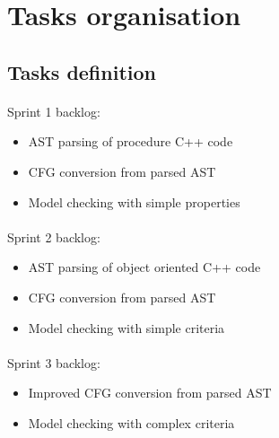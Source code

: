 \documentclass{report}
\begin{document}
\section{Tasks organisation}

\subsection{Tasks definition}

\paragraph{}
\hspace{4mm}\textnormal{Sprint 1 backlog:}

\vspace{3mm}
\begin{itemize}
\item AST parsing of procedure C++ code\vspace{1mm}
\item CFG conversion from parsed AST\vspace{1mm}
\item Model checking with simple properties\vspace{1mm}
\end{itemize}

\paragraph{}
\hspace{4mm}\textnormal{Sprint 2 backlog:}

\vspace{3mm}
\begin{itemize}
\item AST parsing of object oriented C++ code\vspace{1mm}
\item CFG conversion from parsed AST\vspace{1mm}
\item Model checking with simple criteria\vspace{1mm}
\end{itemize}

\paragraph{}
\hspace{4mm}\textnormal{Sprint 3 backlog:}

\vspace{3mm}
\begin{itemize}
\item Improved CFG conversion from parsed AST\vspace{1mm}
\item Model checking with complex criteria\vspace{1mm}
\end{itemize}
\end{document}
